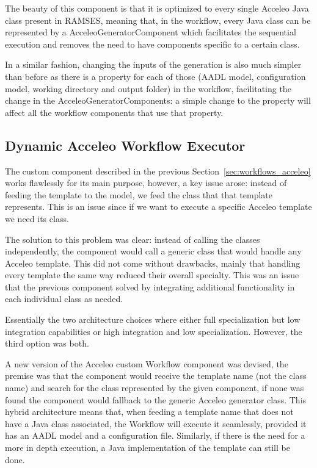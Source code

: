 The beauty of this component is that it is optimized to every single Acceleo Java class present in \gls{RAMSES}, meaning that, in the workflow, every Java class can be represented by a AcceleoGeneratorComponent which facilitates the sequential execution and removes the need to have components specific to a certain class.

In a similar fashion, changing the inputs of the generation is also much simpler than before as there is a property for each of those (\gls{AADL} model, configuration model, working directory and output folder) in the workflow, facilitating the change in the AcceleoGeneratorComponents: a simple change to the property will affect all the workflow components that use that property.


\subsection{Dynamic Acceleo Workflow Executor}
\label{sec:workflows_dynamic_executor}

The custom component described in the previous Section~\ref{sec:workflows_acceleo} works flawlessly for its main purpose, however, a key issue arose: instead of feeding the template to the model, we feed the class that that template represents. This is an issue since if we want to execute a specific Acceleo template we need its class.

The solution to this problem was clear: instead of calling the classes independently, the component would call a generic class that would handle any Acceleo template. This did not come without drawbacks, mainly that handling every template the same way reduced their overall specialty. This was an issue that the previous component solved by integrating additional functionality in each individual class as needed.

Essentially the two architecture choices where either full specialization but low integration capabilities or high integration and low specialization. However, the third option was both.

A new version of the Acceleo custom Workflow component was devised, the premise was that the component would receive the template name (not the class name) and search for the class represented by the given component, if none was found the component would fallback to the generic Acceleo generator class. This hybrid architecture means that, when feeding a template name that does not have a Java class associated, the Workflow will execute it seamlessly, provided it has an \gls{AADL} model and a configuration file. Similarly, if there is the need for a more in depth execution, a Java implementation of the template can still be done.


